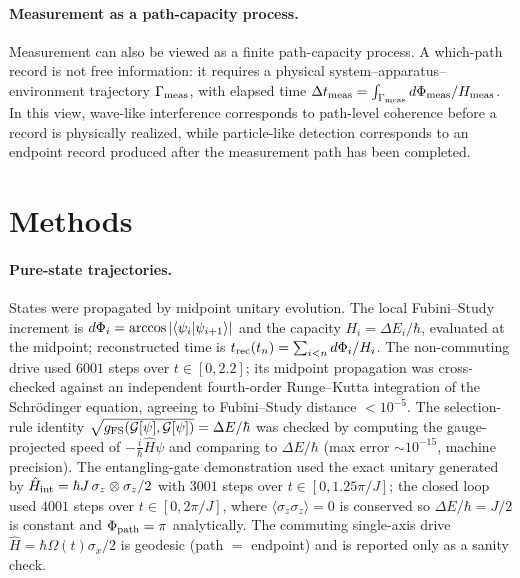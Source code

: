 \documentclass[12pt]{article}
\begin{document}
\paragraph{Measurement as a path-capacity process.}
Measurement can also be viewed as a finite path-capacity process. A which-path record is not free information: it requires a physical system--apparatus--environment trajectory \(\Gamma_{\rm meas}\), with elapsed time \(\Delta t_{\rm meas}=\int_{\Gamma_{\rm meas}} d\Phi_{\rm meas}/H_{\rm meas}\). In this view, wave-like interference corresponds to path-level coherence before a record is physically realized, while particle-like detection corresponds to an endpoint record produced after the measurement path has been completed.

\section{Methods}

\paragraph{Pure-state trajectories.}
States were propagated by midpoint unitary evolution. The local Fubini--Study increment is \(d\Phi_i=\arccos\abs{\braket{\psi_i}{\psi_{i+1}}}\) and the capacity \(H_i=\Delta E_i/\hbar\), evaluated at the midpoint; reconstructed time is \(t_{\rm rec}(t_n)=\sum_{i<n} d\Phi_i/H_i\). The non-commuting drive used \(6001\) steps over \(t\in[0,2.2]\); its midpoint propagation was cross-checked against an independent fourth-order Runge--Kutta integration of the Schr\"odinger equation, agreeing to Fubini--Study distance \(<10^{-5}\). The selection-rule identity \(\sqrt{g_{\rm FS}(\mathcal G[\psi],\mathcal G[\psi])}=\Delta E/\hbar\) was checked by computing the gauge-projected speed of \(-\tfrac{i}{\hbar}\hat H\psi\) and comparing to \(\Delta E/\hbar\) (max error \(\sim\!10^{-15}\), machine precision). The entangling-gate demonstration used the exact unitary generated by \(\hat H_{\rm int}=\hbar J\,\sigma_z\otimes\sigma_z/2\) with \(3001\) steps over \(t\in[0,1.25\pi/J]\); the closed loop used \(4001\) steps over \(t\in[0,2\pi/J]\), where \(\langle\sigma_z\sigma_z\rangle=0\) is conserved so \(\Delta E/\hbar=J/2\) is constant and \(\Phi_{\rm path}=\pi\) analytically. The commuting single-axis drive \(\hat H=\hbar\Omega(t)\sigma_x/2\) is geodesic (path \(=\) endpoint) and is reported only as a sanity check.
\end{document}
